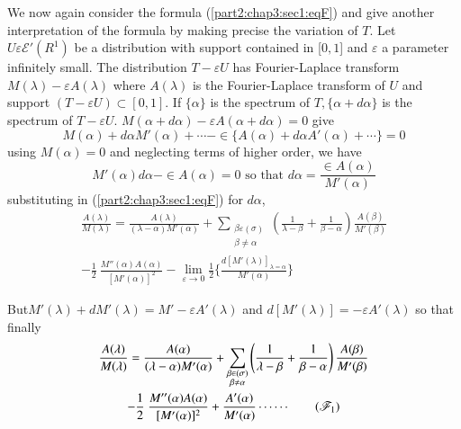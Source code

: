 We now again consider the formula (\ref{part2:chap3:sec1:eqF}) and give another
interpretation of the formula by making precise the variation of
$T$. Let $U \varepsilon  \mathscr{E}' (R^1)$ be a distribution with support
contained in [$0,1$] and $\varepsilon $ a parameter infinitely small. The
distribution $T - \varepsilon  U$ has Fourier-Laplace transform $M (\lambda ) -
\varepsilon  A (\lambda )$ where $A (\lambda )$ is the Fourier-Laplace
transform of $U$ and support $(T - \varepsilon  U) \subset [ 0, 1]$. If $\{
\alpha \}$ is the spectrum of $T, \{ \alpha + d\alpha \}$ is the
spectrum of $T - \varepsilon  U$. $M (\alpha + d \alpha ) - \varepsilon  A (\alpha + d
\alpha ) = 0$ give 
$$
M(\alpha ) + d \alpha M'(\alpha ) + \cdots - \in  \{A(\alpha ) + d
\alpha A' (\alpha ) + \cdots \} = 0 
$$
using $M (\alpha ) = 0$ and neglecting terms of higher order, we have 
$$
M' (\alpha ) d \alpha - \in  A(\alpha ) = 0 \text{ so that } d \alpha =
\frac{\in  A (\alpha )}{M' (\alpha )} 
$$
substituting in (\ref{part2:chap3:sec1:eqF}) for $d \alpha$,
\begin{multline*}
  \frac{A(\lambda )}{M(\lambda)} = \frac{A(\lambda )}{(\lambda - \alpha
    ) M' (\alpha )} + \sum_{\substack{\beta \varepsilon  (\sigma) \\ \beta \neq
      \alpha}} \left(\frac{1}{\lambda - \beta} + \frac{1}{\beta -
    \alpha}\right)  \frac{A(\beta )}{M' (\beta)}\\ 
  - \frac{1}{2} ~ \frac{M'' (\alpha )
    A(\alpha )}{[M' (\alpha)]^2} - \lim\limits_{\varepsilon  \to 0} \frac{1}{2}
  \Bigg\{ \frac{d[M' (\lambda )]_{\lambda = \alpha}}{M' (\alpha)}
  \Bigg\} 
\end{multline*}

But\pageoriginale $M' (\lambda ) + d M' (\lambda ) = M' - \varepsilon  A' (\lambda )$ and $d
[M' (\lambda )] = - \varepsilon  A'(\lambda )$ so that finally 
\begin{multline*}
  \frac{A(\lambda )}{M(\lambda )} = \frac{A(\alpha )}{(\lambda -
    \alpha ) M' (\alpha )} + \sum_{\substack{\beta \in (\sigma )
      \\ \beta \neq \alpha}} \left(\frac{1}{\lambda - \beta} +
  \frac{1}{\beta - \alpha}\right) \frac{A(\beta )}{M' (\beta )}\\ 
  -\frac{1}{2}
  ~ \frac{M'' (\alpha ) A (\alpha )}{[M' (\alpha )]^2} + \frac{A'
    (\alpha )}{M' (\alpha )} \cdots \cdots
  \tag{$\mathscr{F}_1$}\label{part2:chap3:sec4:eqF1}  
\end{multline*}

